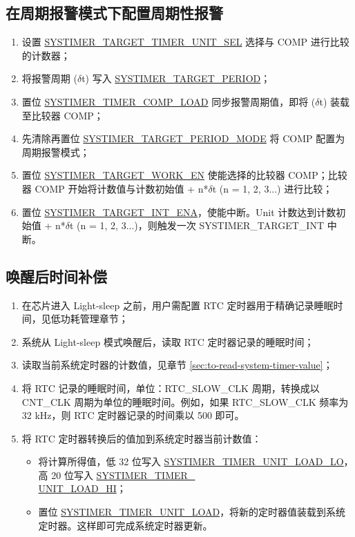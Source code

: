 \documentclass[main\_\_CN.tex]{subfiles}
\begin{document}
\subsection{在周期报警模式下配置周期性报警}
\begin{enumerate}
    \item 设置 \hyperref[fielddesc:SYSTIMERTARGET0TIMERUNITSEL]{SYSTIMER\_TARGET\_TIMER\_UNIT\_SEL} 选择与 COMP 进行比较的计数器；
    \item 将报警周期 ($\delta$t) 写入 \hyperref[fielddesc:SYSTIMERTARGET0PERIOD]{SYSTIMER\_TARGET\_PERIOD}；
    \item 置位 \hyperref[fielddesc:SYSTIMERTIMERCOMP0LOAD]{SYSTIMER\_TIMER\_COMP\_LOAD} 同步报警周期值，即将 ($\delta$t) 装载至比较器 COMP；
    \item 先清除再置位 \hyperref[fielddesc:SYSTIMERTARGET0PERIODMODE]{SYSTIMER\_TARGET\_PERIOD\_MODE} 将 COMP 配置为周期报警模式；
    \item 置位 \hyperref[fielddesc:SYSTIMERTARGET0WORKEN]{SYSTIMER\_TARGET\_WORK\_EN} 使能选择的比较器 COMP；比较器 COMP 开始将计数值与计数初始值 + n*$\delta$t (n = 1, 2, 3...) 进行比较；
    \item 置位 \hyperref[fielddesc:SYSTIMERTARGET0INTENA]{SYSTIMER\_TARGET\_INT\_ENA}，使能中断。Unit 计数达到计数初始值 + n*$\delta$t (n = 1, 2, 3...)，则触发一次 SYSTIMER\_TARGET\_INT 中断。
\end{enumerate}


\subsection{唤醒后时间补偿}
\begin{enumerate}
    \item 在芯片进入 Light-sleep 之前，用户需配置 RTC 定时器用于精确记录睡眠时间，见低功耗管理章节；
    \item 系统从 Light-sleep 模式唤醒后，读取 RTC 定时器记录的睡眠时间；
    \item 读取当前系统定时器的计数值，见章节  \ref{sec:to-read-system-timer-value}；
    \item 将 RTC 记录的睡眠时间，单位：RTC\_SLOW\_CLK 周期，转换成以 CNT\_CLK 周期为单位的睡眠时间。例如，如果 RTC\_SLOW\_CLK 频率为 32 kHz，则 RTC 定时器记录的时间乘以 500 即可。
    \item 将 RTC 定时器转换后的值加到系统定时器当前计数值：
    \begin{itemize}
        \item 将计算所得值，低 32 位写入 \hyperref[fielddesc:SYSTIMERTIMERUNIT0LOADLO]{SYSTIMER\_TIMER\_UNIT\_LOAD\_LO}，高 20 位写入 \hyperref[fielddesc:SYSTIMERTIMERUNIT0LOADHI]{SYSTIMER\_TIMER\_\\UNIT{}\_LOAD\_HI}；
        \item 置位 \hyperref[fielddesc:SYSTIMERTIMERUNIT0LOAD]{SYSTIMER\_TIMER\_UNIT\_LOAD}，将新的定时器值装载到系统定时器。这样即可完成系统定时器更新。
        \end{itemize}
\end{enumerate}
\end{document}
